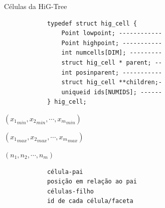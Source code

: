 \documentclass[../main/main.tex]{subfiles}
\begin{document}
\begin{frame}[fragile]{\smaller \smaller Células da HiG-Tree}
	\begin{minipage}{0.45\textwidth}
		\begin{verbatim}
			typedef struct hig_cell {
				Point lowpoint; ------------
				Point highpoint; -----------
				int numcells[DIM]; ---------
				struct hig_cell * parent; --
				int posinparent; -----------
				struct hig_cell **children;-
				uniqueid ids[NUMIDS]; ------
			} hig_cell;
		\end{verbatim}
	\end{minipage}
	\hfill
	\begin{minipage}{0.45\textwidth}
		\vspace{-.1cm}
		$({x_1}_{min},{x_2}_{min},\cdots,{x_m}_{min})$
		
		$({x_1}_{max},{x_2}_{max},\cdots,{x_m}_{max})$
		
		$(n_1, n_2, \cdots, n_m)$
		\vspace{-.3cm}
		\begin{verbatim}
			célula-pai
			posição em relação ao pai
			células-filho
			id de cada célula/faceta
		\end{verbatim}
		
	\end{minipage}
\end{frame}
\end{document}
